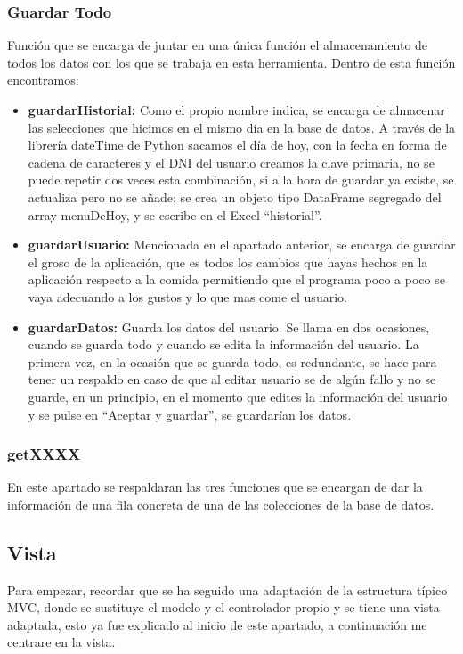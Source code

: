 \subsubsection{Guardar Todo}
Función que se encarga de juntar en una única función el almacenamiento de todos los datos con los que se trabaja en esta herramienta. Dentro de esta función encontramos:
\begin{itemize}
\item	\textbf{guardarHistorial:} Como el propio nombre indica, se encarga de almacenar las selecciones que hicimos en el mismo día en la base de datos. A través de la librería dateTime de Python sacamos el día de hoy, con la fecha en forma de cadena de caracteres y el DNI del usuario creamos la clave primaria, no se puede repetir dos veces esta combinación, si a la hora de guardar ya existe, se actualiza pero no se añade; se crea un objeto tipo DataFrame segregado del array menuDeHoy, y se escribe en el Excel “historial”.
\item	\textbf{guardarUsuario:} Mencionada en el apartado anterior, se encarga de guardar el groso de la aplicación, que es todos los cambios que hayas hechos en la aplicación respecto a la comida permitiendo que el programa poco a poco se vaya adecuando a los gustos y lo que mas come el usuario.
\item	\textbf{guardarDatos:} Guarda los datos del usuario. Se llama en dos ocasiones, cuando se guarda todo y cuando se edita la información del usuario. La primera vez, en la ocasión que se guarda todo, es redundante, se hace para tener un respaldo en caso de que al editar usuario se de algún fallo y no se guarde, en un principio, en el momento que edites la información del usuario y se pulse en “Aceptar y guardar”, se guardarían los datos.
\end{itemize}

\subsubsection{getXXXX}
En este apartado se respaldaran las tres funciones que se encargan de dar la información de una fila concreta de una de las colecciones de la base de datos.
\subsection{Vista}
Para empezar, recordar que se ha seguido una adaptación de la estructura  típico MVC, donde se sustituye el modelo y el controlador propio y se tiene una vista adaptada, esto ya fue explicado al inicio de este apartado, a continuación me centrare en la vista.\\

